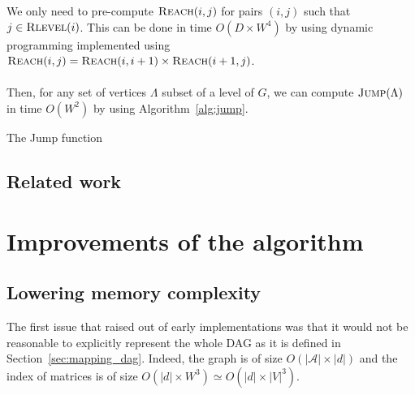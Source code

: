 \documentclass[12px]{article}
\theoremstyle{definition}
\begin{document}
          We only need to pre-compute $\Call{Reach}{i, j}$ for pairs $(i, j)$
          such that $j \in \Call{Rlevel}{i}$. This can be done in time $O(D
          \times W^{4})$ by using dynamic programming implemented using
          $\Call{Reach}{i, j} = \Call{Reach}{i, i+1} \times \Call{Reach}{i+1,
          j}$.

        \paragraph{} Then, for any set of vertices $\Lambda$ subset of a level
        of $G$, we can compute $\Call{Jump}{\Lambda}$ in time $O(W^2)$ by using
        Algorithm~\ref{alg:jump}.

        \begin{algorithm}[H]
          \caption{The Jump function}%
          \label{alg:jump}
          \begin{algorithmic}[1]
                \State{\Return{$\Lambda$}}
              \Else{}
              \EndIf{}
            \EndFunction{}
          \end{algorithmic}
        \end{algorithm}

    \subsection{Related work}


  \section{Improvements of the algorithm}

    \subsection{Lowering memory complexity}

      The first issue that raised out of early implementations was that it
      would not be reasonable to explicitly represent the whole DAG as it is
      defined in Section~\ref{sec:mapping_dag}. Indeed, the graph is of size
      $O(|\mathcal{A}| \times |d|)$ and the index of matrices 
      is of size $O(|d| \times W^3) \simeq O(|d| \times |V|^3)$.
\end{document}
